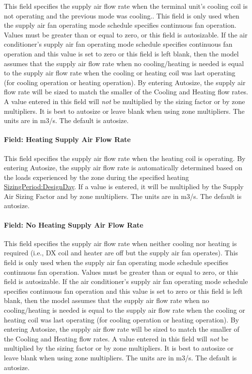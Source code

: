 This field specifies the supply air flow rate when the terminal unit's cooling coil is not operating and the previous mode was cooling.. This field is only used when the supply air fan operating mode schedule specifies continuous fan operation. Values must be greater than or equal to zero, or this field is autosizable. If the air conditioner's supply air fan operating mode schedule specifies continuous fan operation and this value is set to zero or this field is left blank, then the model assumes that the supply air flow rate when no cooling/heating is needed is equal to the supply air flow rate when the cooling or heating coil was last operating (for cooling operation or heating operation). By entering Autosize, the supply air flow rate will be sized to match the smaller of the Cooling and Heating flow rates. A value entered in this field will \emph{not} be multiplied by the sizing factor or by zone multipliers. It is best to autosize or leave blank when using zone multipliers. The units are in m3/s. The default is autosize.

\paragraph{Field: Heating Supply Air Flow Rate}\label{field-heating-supply-air-flow-rate-3}

This field specifies the supply air flow rate when the heating coil is operating. By entering Autosize, the supply air flow rate is automatically determined based on the loads experienced by the zone during the specified heating \hyperref[sizingperioddesignday]{SizingPeriod:DesignDay}. If a value is entered, it will be multiplied by the Supply Air Sizing Factor and by zone multipliers. The units are in m3/s. The default is autosize.

\paragraph{Field: No Heating Supply Air Flow Rate}\label{field-no-heating-supply-air-flow-rate}

This field specifies the supply air flow rate when neither cooling nor heating is required (i.e., DX coil and heater are off but the supply air fan operates). This field is only used when the supply air fan operating mode schedule specifies continuous fan operation. Values must be greater than or equal to zero, or this field is autosizable. If the air conditioner's supply air fan operating mode schedule specifies continuous fan operation and this value is set to zero or this field is left blank, then the model assumes that the supply air flow rate when no cooling/heating is needed is equal to the supply air flow rate when the cooling or heating coil was last operating (for cooling operation or heating operation). By entering Autosize, the supply air flow rate will be sized to match the smaller of the Cooling and Heating flow rates. A value entered in this field will \emph{not} be multiplied by the sizing factor or by zone multipliers. It is best to autosize or leave blank when using zone multipliers. The units are in m3/s. The default is autosize.

